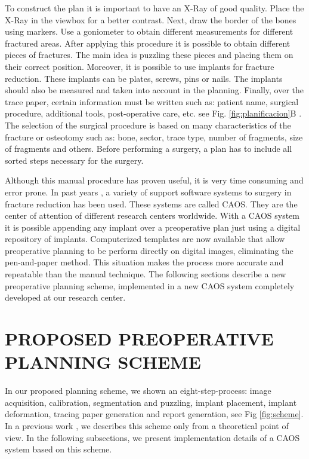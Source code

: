 \documentclass{cimenics}
\begin{document}
To construct the plan it is important to have an X-Ray of good
quality. Place the X-Ray in the viewbox for a better contrast.
Next, draw the border of the bones using markers. Use a goniometer
to obtain different measurements for different fractured areas.
After applying this procedure it is possible to obtain different
pieces of fractures. The main idea is puzzling these pieces and
placing them on their correct position. Moreover, it is possible
to use implants for fracture reduction. These implants can be
plates, screws, pins or nails. The implants should also be
measured and taken into account in the planning. Finally, over the
trace paper, certain information must be written such as: patient
name, surgical procedure, additional tools, post-operative care,
etc. see Fig. \ref{fig:planificacion}\color{red}B \color{black}.
The selection of the surgical procedure is based on many
characteristics of the fracture or osteotomy such as: bone,
sector, trace type, number of fragments, size of fragments and
others. Before performing a surgery, a plan has to include all
sorted steps necessary for the surgery.

Although this manual procedure has proven useful, it is very time
consuming and error prone. In past years \cite{CIT07}, a
variety of support software systems to surgery in fracture
reduction has been used. These systems are called CAOS. They are the center of attention of
different research centers worldwide. With a CAOS system it is
possible appending any implant over a preoperative plan just using
a digital repository of implants. Computerized templates are now
available that allow preoperative planning to be perform directly
on digital images, eliminating the pen-and-paper method. This
situation makes the process more accurate and repeatable than the
manual technique. The following sections describe a new
preoperative planning scheme, implemented in a new CAOS system
completely developed at our research center.

\section{PROPOSED PREOPERATIVE PLANNING SCHEME}

In our proposed planning scheme, we shown an eight-step-process:
image acquisition, calibration, segmentation and puzzling, implant
placement, implant deformation, tracing paper generation and
report generation, see Fig \ref{fig:scheme}. In a previous work \cite{RAM09}, we describes this scheme  only from a theoretical point of view. In the following subsections, we present implementation details of a CAOS system based on this scheme.
\end{document}

